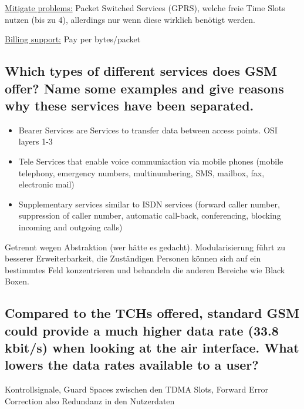 \underline{Mitigate problems:} Packet Switched Services (GPRS), welche freie Time Slots nutzen (bis zu 4), allerdings nur wenn diese wirklich benötigt werden.

\underline{Billing support:} Pay per bytes/packet

\subsection{Which types of different services does GSM offer? Name some examples and give reasons why these services have been separated.}
\begin{itemize}
\item Bearer Services are Services to transfer data between access points. OSI layers 1-3

\item Tele Services that enable voice communiaction via mobile phones (mobile telephony, emergency numbers, multinumbering, SMS, mailbox, fax, electronic mail)

\item Supplementary services similar to ISDN services (forward caller number, suppression of caller number, automatic call-back, conferencing, blocking incoming and outgoing calls)
\end{itemize}

Getrennt wegen Abstraktion (wer hätte es gedacht). Modularisierung führt zu besserer Erweiterbarkeit, die Zuständigen Personen können sich auf ein bestimmtes Feld konzentrieren und behandeln die anderen Bereiche wie Black Boxen.


\subsection{Compared to the TCHs offered, standard GSM could provide a much higher data rate (33.8 kbit/s) when looking at the air interface. What lowers the data rates available to a user?}
Kontrollsignale, Guard Spaces zwischen den TDMA Slots, Forward Error Correction also Redundanz in den Nutzerdaten

